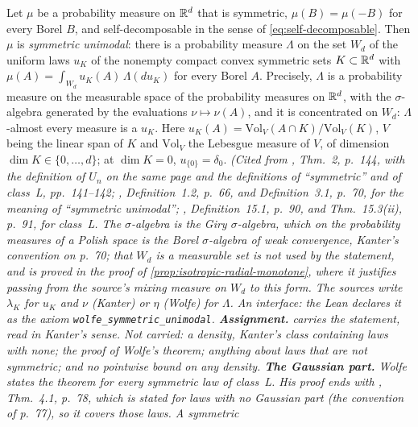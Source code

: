 \begin{theorem}
\label{thm:cited-A8}
\leanok
Let $\mu$ be a probability measure on $\mathbb{R}^d$ that is symmetric, $\mu(B) = \mu(-B)$ for every
Borel $B$, and self-decomposable in the sense of \ref{eq:self-decomposable}. Then $\mu$ is
\emph{symmetric unimodal}: there is a probability measure $\Lambda$ on the set $W_d$ of the uniform
laws $u_K$ of the nonempty compact convex symmetric sets $K \subset \mathbb{R}^d$ with
$\mu(A) = \int_{W_d} u_K(A)\,\Lambda(du_K)$ for every Borel $A$. Precisely, $\Lambda$ is a
probability measure on the measurable space of the probability measures on $\mathbb{R}^d$, with the
$\sigma$-algebra generated by the evaluations $\nu \mapsto \nu(A)$, and it is concentrated on $W_d$:
$\Lambda$-almost every measure is a $u_K$. Here
$u_K(A) = \mathrm{Vol}_V(A \cap K)/\mathrm{Vol}_V(K)$, $V$ being the linear span of $K$ and
$\mathrm{Vol}_V$ the Lebesgue measure of $V$, of dimension $\operatorname{dim} K \in \{0,\dots,d\}$;
at $\operatorname{dim} K = 0$, $u_{\{0\}} = \delta_0$.
\statusA\quad{}\quad\emph{(Cited from , Thm.~2, p.~144,
with the definition of $U_n$ on the same page and the definitions of ``symmetric'' and of class~L,
pp.~141--142; , Definition~1.2, p.~66, and Definition~3.1, p.~70,
for the meaning of ``symmetric unimodal''; , Definition~15.1, p.~90, and
Thm.~15.3(ii), p.~91, for class~L. The $\sigma$-algebra is the Giry $\sigma$-algebra, which on the
probability measures of a Polish space is the Borel $\sigma$-algebra of weak convergence, Kanter's
convention on p.~70; that $W_d$ is a measurable set is not used by the statement, and is proved
in the proof of \ref{prop:isotropic-radial-monotone}, where it justifies passing from the
source's mixing measure on $W_d$ to this form. The sources write $\lambda_K$ for
$u_K$ and $\nu$ (Kanter) or $\eta$ (Wolfe) for $\Lambda$. An interface: the Lean declares it as
the axiom \texttt{wolfe\_symmetric\_unimodal}. \textbf{Assignment.}  carries the
statement, read in Kanter's sense. Not carried: a density, Kanter's class containing laws with none;
the proof of Wolfe's theorem; anything about laws that are not symmetric; and no pointwise bound on
any density. \textbf{The Gaussian part.} Wolfe states the theorem for every symmetric law of
class~L. His proof ends with , Thm.~4.1, p.~78, which is stated for
laws with no Gaussian part (the convention of p.~77), so it covers those laws. A symmetric
}
\end{theorem}
